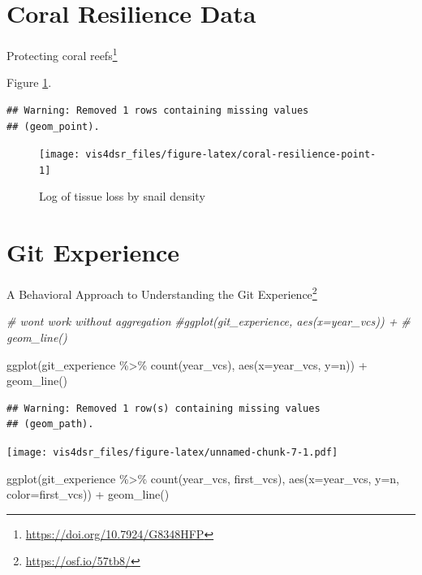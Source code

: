 \documentclass[
]{krantz}
\makeatletter
\newenvironment{Shaded}{\begin{snugshade}}{\end{snugshade}}
\newcommand{\AttributeTok}[1]{\textcolor[rgb]{0.61,0.61,0.61}{#1}}
\newcommand{\CommentTok}[1]{\textcolor[rgb]{0.37,0.37,0.37}{\textit{#1}}}
\newcommand{\FunctionTok}[1]{\textcolor[rgb]{0,0,0}{#1}}
\newcommand{\NormalTok}[1]{#1}
\newcommand{\SpecialCharTok}[1]{\textcolor[rgb]{0,0,0}{#1}}
\renewcommand{\href}[2]{#2\footnote{\url{#1}}}
\newenvironment{kframe}{%
\medskip{}
\setlength{\fboxsep}{.8em}
 \def\at@end@of@kframe{}%
 \ifinner\ifhmode%
  \def\at@end@of@kframe{\end{minipage}}%
  \begin{minipage}{\columnwidth}%
 \fi\fi%
 \def\FrameCommand##1{\hskip\@totalleftmargin \hskip-\fboxsep
 \colorbox{shadecolor}{##1}\hskip-\fboxsep
     \hskip-\linewidth \hskip-\@totalleftmargin \hskip\columnwidth}%
 \MakeFramed {\advance\hsize-\width
   \@totalleftmargin\z@ \linewidth\hsize
   \@setminipage}}%
 {\par\unskip\endMakeFramed%
 \at@end@of@kframe}
\renewenvironment{Shaded}{\begin{kframe}}{\end{kframe}}
\makeatother
\begin{document}
\hypertarget{coral-resilience-data}{%
\section*{Coral Resilience Data}\label{coral-resilience-data}}


\href{https://doi.org/10.7924/G8348HFP}{Protecting coral reefs}

Figure \ref{fig:coral-resilience-point}.

\begin{verbatim}
## Warning: Removed 1 rows containing missing values
## (geom_point).
\end{verbatim}

\begin{figure}
\texttt{[image: vis4dsr\_files/figure-latex/coral-resilience-point-1]} \caption{Log of tissue loss by snail density}\label{fig:coral-resilience-point}
\end{figure}

\hypertarget{git-experience}{%
\section*{Git Experience}\label{git-experience}}


\href{https://osf.io/57tb8/}{A Behavioral Approach to Understanding the Git Experience}

\begin{Shaded}
\begin{Highlighting}[]
\CommentTok{\# won\textquotesingle{}t work without aggregation}
\CommentTok{\#ggplot(git\_experience, aes(x=year\_vcs)) +}
\CommentTok{\#  geom\_line()}

\FunctionTok{ggplot}\NormalTok{(git\_experience }\SpecialCharTok{\%\textgreater{}\%} \FunctionTok{count}\NormalTok{(year\_vcs), }\FunctionTok{aes}\NormalTok{(}\AttributeTok{x=}\NormalTok{year\_vcs, }\AttributeTok{y=}\NormalTok{n)) }\SpecialCharTok{+}
  \FunctionTok{geom\_line}\NormalTok{()}
\end{Highlighting}
\end{Shaded}

\begin{verbatim}
## Warning: Removed 1 row(s) containing missing values
## (geom_path).
\end{verbatim}

\texttt{[image: vis4dsr\_files/figure-latex/unnamed-chunk-7-1.pdf]}

\begin{Shaded}
\begin{Highlighting}[]
\FunctionTok{ggplot}\NormalTok{(git\_experience }\SpecialCharTok{\%\textgreater{}\%} \FunctionTok{count}\NormalTok{(year\_vcs, first\_vcs), }\FunctionTok{aes}\NormalTok{(}\AttributeTok{x=}\NormalTok{year\_vcs, }\AttributeTok{y=}\NormalTok{n, }\AttributeTok{color=}\NormalTok{first\_vcs)) }\SpecialCharTok{+}
  \FunctionTok{geom\_line}\NormalTok{()}
\end{Highlighting}
\end{Shaded}
\end{document}
